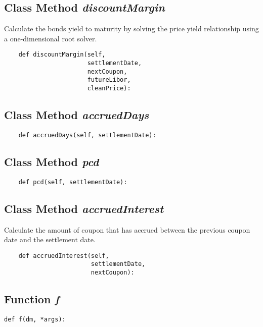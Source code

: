 \documentclass[twoside,11pt]{book}
\begin{document}
\subsection{Class Method {\it discountMargin}}
Calculate the bonds yield to maturity by solving the price yield relationship using a one-dimensional root solver. 

\begin{lstlisting}
    def discountMargin(self, 
                       settlementDate,
                       nextCoupon, 
                       futureLibor,
                       cleanPrice):
\end{lstlisting}

\subsection{Class Method {\it accruedDays}}


\begin{lstlisting}
    def accruedDays(self, settlementDate):
\end{lstlisting}

\subsection{Class Method {\it pcd}}


\begin{lstlisting}
    def pcd(self, settlementDate):
\end{lstlisting}

\subsection{Class Method {\it accruedInterest}}
Calculate the amount of coupon that has accrued between the previous coupon date and the settlement date. 

\begin{lstlisting}
    def accruedInterest(self, 
                        settlementDate, 
                        nextCoupon):
\end{lstlisting}

\subsection{Function {\it f}}


\begin{lstlisting}
def f(dm, *args):
\end{lstlisting}
\end{document}
